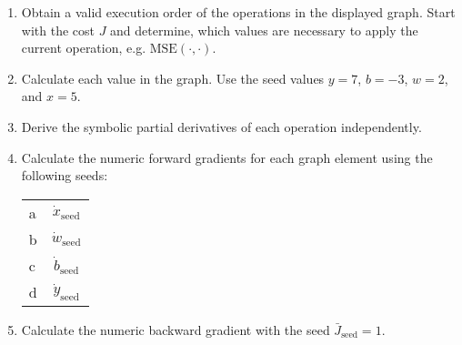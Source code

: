 \begin{enumerate}
\item Obtain a valid execution order of the operations in the displayed graph.
Start with the cost $J$ and determine, which values are necessary to apply the current operation, e.g. $\mathrm{MSE}(\cdot, \cdot)$.
\item Calculate each value in the graph.
Use the seed values $y=7$, $b=-3$, $w=2$, and $x=5$.
\item Derive the symbolic partial derivatives of each operation independently.
\item Calculate the numeric forward gradients for each graph element using the following seeds:
\begin{tabular}{
l
@{\hskip 0ex)\hskip 1ex}
c
@{\,$=1$ others 0}
}
a & $\dot x_{\mathrm{seed}}$ \\
b & $\dot w_{\mathrm{seed}}$ \\
c & $\dot b_{\mathrm{seed}}$ \\
d & $\dot y_{\mathrm{seed}}$ \\
\end{tabular}
\item Calculate the numeric backward gradient with the seed $\bar J_{\mathrm{seed}}=1$.
\end{enumerate}



